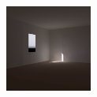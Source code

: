 \begin{figure}[t]
\includegraphics[width=1.11in]{images/renovations/PRE_N6_march_chris.png}\vspace{-0.13in}\\ 



\end{figure}
